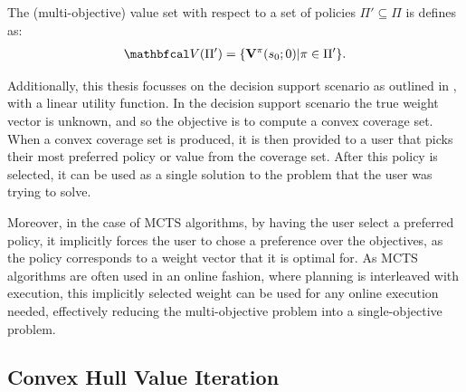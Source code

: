 
    \begin{defn}
        \label{def:mo_value_set}
        The \textnormal{(multi-objective) value set} with respect to a set of policies $\Pi'\subseteq\Pi$ is defines as:
        \begin{align}
            \bfcl{V}(\Pi') = \{\bff{V}^{\pi}(s_0;0) | \pi \in \Pi'\}.
        \end{align}
    \end{defn}


    Additionally, this thesis focusses on the decision support scenario as outlined in , with a linear utility function. In the decision support scenario the true weight vector is unknown, and so the objective is to compute a convex coverage set. When a convex coverage set is produced, it is then provided to a user that picks their most preferred policy or value from the coverage set. After this policy is selected, it can be used as a single solution to the problem that the user was trying to solve. 

    Moreover, in the case of MCTS algorithms, by having the user select a preferred policy, it implicitly forces the user to chose a preference over the objectives, as the policy corresponds to a weight vector that it is optimal for. As MCTS algorithms are often used in an online fashion, where planning is interleaved with execution, this implicitly selected weight can be used for any online execution needed, effectively reducing the multi-objective problem into a single-objective problem. 





    \subsection{Convex Hull Value Iteration}
    \label{sec:2-4-1-chvi}

